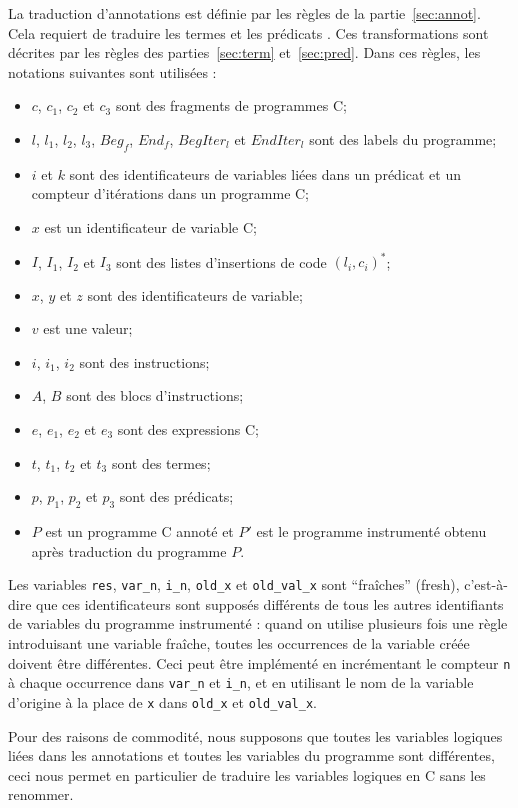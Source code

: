 La traduction d'annotations est définie par les règles de la
partie~\ref{sec:annot}.
Cela requiert de traduire les termes et les prédicats \eacsl.
Ces transformations sont décrites par les règles des parties~\ref{sec:term}
et~\ref{sec:pred}.
Dans ces règles, les notations suivantes sont utilisées :
\begin{itemize}
\item $c$, $c_1$, $c_2$ et $c_3$ sont des fragments de programmes C;
\item $l$, $l_1$, $l_2$, $l_3$, $Beg_f$, $End_f$, $BegIter_l$ et $EndIter_l$ sont
  des labels du programme;
\item $i$ et $k$ sont des identificateurs de variables liées
  dans un prédicat \eacsl et un compteur d'itérations dans un programme C;
\item $x$ est un identificateur de variable C;
\item $I$, $I_1$, $I_2$ et $I_3$ sont des listes d'insertions de code
  $(l_i, c_i)^*$;
\item $x$, $y$ et $z$ sont des identificateurs de variable;
\item $v$ est une valeur;
\item $i$, $i_1$, $i_2$ sont des instructions;
\item $A$, $B$ sont des blocs d'instructions;
\item $e$, $e_1$, $e_2$ et $e_3$ sont des expressions C;
\item $t$, $t_1$, $t_2$ et $t_3$ sont des termes;
\item $p$, $p_1$, $p_2$ et $p_3$ sont des prédicats;
\item $P$ est un programme C annoté et $P'$ est le programme instrumenté
  obtenu après traduction du programme $P$.
\end{itemize}

Les variables \lstinline'res', \lstinline'var_n', \lstinline'i_n',
\lstinline|old_x| et \lstinline'old_val_x' sont
``fraîches'' (fresh), c'est-à-dire que ces identificateurs sont supposés
différents de tous les autres identifiants de variables du programme instrumenté
: quand on utilise plusieurs fois une règle introduisant une variable fraîche,
toutes les occurrences de la variable créée doivent être différentes.
Ceci peut être implémenté en incrémentant le compteur \lstinline'n' à chaque
occurrence dans \lstinline'var_n' et \lstinline'i_n', et en utilisant le nom de
la variable d'origine à la place de \lstinline'x' dans \lstinline'old_x' et
\lstinline'old_val_x'.

Pour des raisons de commodité, nous supposons que toutes les variables logiques
liées dans les annotations et toutes les variables du programme sont
différentes, ceci nous permet en particulier de traduire les variables logiques
en C sans les renommer.


